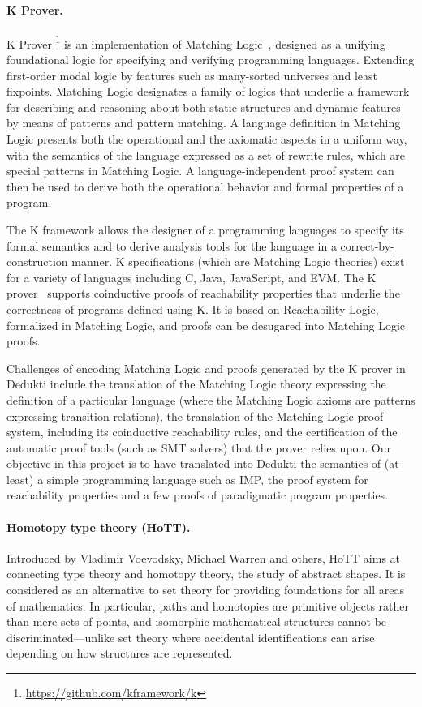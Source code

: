 \paragraph*{K Prover.}
K Prover \footnote{\url{https://github.com/kframework/k}} is an
implementation of Matching Logic~\cite{rosu:matching}, designed as a
unifying foundational logic for specifying and verifying programming
languages. Extending first-order modal logic by features such as
many-sorted universes and least fixpoints.  Matching Logic designates
a family of logics that underlie a framework for describing and
reasoning about both static structures and dynamic features by means
of patterns and pattern matching. A language definition in Matching
Logic presents both the operational and the axiomatic aspects in a
uniform way, with the semantics of the language expressed as a set of
rewrite rules, which are special patterns in Matching Logic. A
language-independent proof system can then be used to derive both the
operational behavior and formal properties of a program.

The K framework allows the designer of a programming languages to
specify its formal semantics and to derive analysis tools for the
language in a correct-by-construction manner. K specifications (which
are Matching Logic theories) exist for a variety of languages
including C, Java, JavaScript, and EVM. The K
prover~\cite{stefanescu:semantics} supports coinductive proofs of
reachability properties that underlie the correctness of programs
defined using K. It is based on Reachability Logic, formalized in
Matching Logic, and proofs can be desugared into Matching Logic
proofs.

Challenges of encoding Matching Logic and proofs generated by the K
prover in Dedukti include the translation of the Matching Logic theory
expressing the definition of a particular language (where the Matching
Logic axioms are patterns expressing transition relations), the
translation of the Matching Logic proof system, including its
coinductive reachability rules, and the certification of the automatic
proof tools (such as SMT solvers) that the prover relies upon. Our
objective in this project is to have translated into Dedukti the
semantics of (at least) a simple programming language such as IMP, the
proof system for reachability properties and a few proofs of
paradigmatic program properties.

\paragraph*{Homotopy type theory (HoTT).}
Introduced by Vladimir Voevodsky, Michael Warren and others, HoTT aims at
connecting type theory and homotopy theory, the study of abstract shapes. It is
considered as an alternative to set theory for providing foundations for all
areas of mathematics. In particular, paths and homotopies are primitive objects
rather than mere sets of points, and isomorphic mathematical structures cannot
be discriminated---unlike set theory where accidental identifications can arise
depending on how structures are represented.

